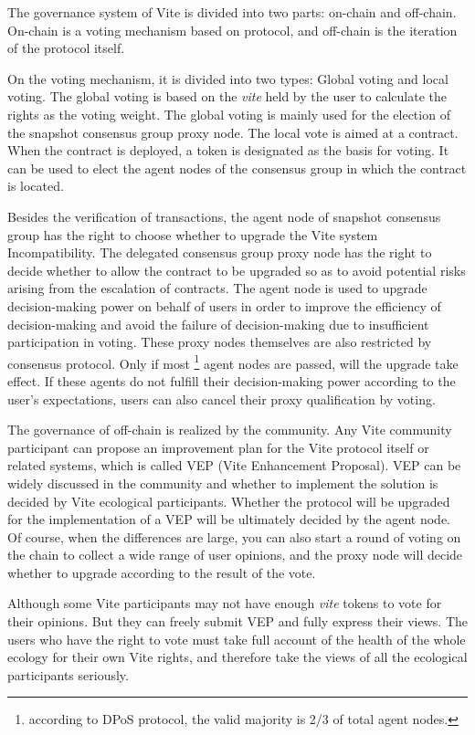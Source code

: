 \documentclass[UTF8,nofonts]{article}
\begin{document}
\begin{multicols}{2}
The governance system of Vite is divided into two parts: on-chain and off-chain. On-chain is a voting mechanism based on protocol, and off-chain is the iteration of the protocol itself.

On the voting mechanism, it is divided into two types: Global voting and local voting. The global voting is based on the \textit{vite} held by the user to calculate the rights as the voting weight. The global voting is mainly used for the election of the snapshot consensus group proxy node. The local vote is aimed at a contract. When the contract is deployed, a token is designated as the basis for voting. It can be used to elect the agent nodes of the consensus group in which the contract is located.

Besides the verification of transactions, the agent node of snapshot consensus group has the right to choose whether to upgrade the Vite system Incompatibility. The delegated consensus group proxy node has the right to decide whether to allow the contract to be upgraded so as to avoid potential risks arising from the escalation of contracts. The agent node is used to upgrade decision-making power on behalf of users in order to improve the efficiency of decision-making and avoid the failure of decision-making due to insufficient participation in voting. These proxy nodes themselves are also restricted by consensus protocol. Only if most \footnote{according to DPoS protocol, the valid majority is 2/3 of total agent nodes.} agent nodes are passed, will the upgrade take effect. If these agents do not fulfill their decision-making power according to the user's expectations, users can also cancel their proxy qualification by voting.

The governance of off-chain is realized by the community. Any Vite community participant can propose an improvement plan for the Vite protocol itself or related systems, which is called VEP (Vite Enhancement Proposal). VEP can be widely discussed in the community and whether to implement the solution is decided by Vite ecological participants. Whether the protocol will be upgraded for the implementation of a VEP will be ultimately decided by the agent node. Of course, when the differences are large, you can also start a round of voting on the chain to collect a wide range of user opinions, and the proxy node will decide whether to upgrade according to the result of the vote.

Although some Vite participants may not have enough \textit{vite} tokens to vote for their opinions. But they can freely submit VEP and fully express their views. The users who have the right to vote must take full account of the health of the whole ecology for their own Vite rights, and therefore take the views of all the ecological participants seriously.



\end{multicols}
\end{document}
